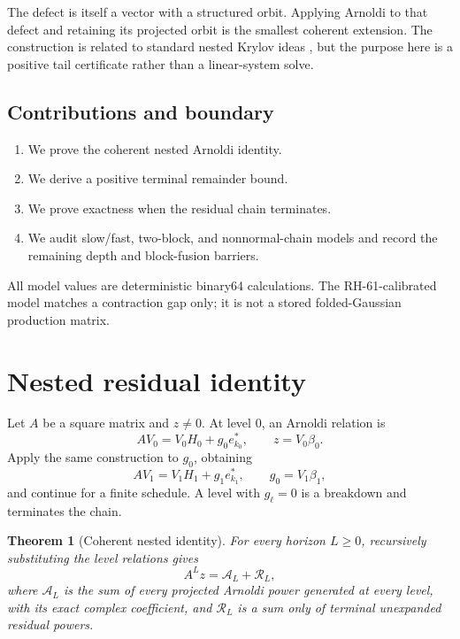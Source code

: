 \documentclass[11pt]{article}
\newtheorem{theorem}{Theorem}[section]
\begin{document}
The defect is itself a vector with a structured orbit.  Applying Arnoldi to
that defect and retaining its projected orbit is the smallest coherent
extension.  The construction is related to standard nested Krylov ideas
\citep{Saad2003,GolubVanLoan2013}, but the purpose here is a positive tail
certificate rather than a linear-system solve.

\subsection*{Contributions and boundary}

\begin{enumerate}[leftmargin=2.2em]
 \item We prove the coherent nested Arnoldi identity.
 \item We derive a positive terminal remainder bound.
 \item We prove exactness when the residual chain terminates.
 \item We audit slow/fast, two-block, and nonnormal-chain models and record
       the remaining depth and block-fusion barriers.
\end{enumerate}

All model values are deterministic binary64 calculations.  The
RH-61-calibrated model matches a contraction gap only; it is not a stored
folded-Gaussian production matrix.

\section{Nested residual identity}
\label{sec:identity}

Let $A$ be a square matrix and $z\ne0$.  At level $0$, an Arnoldi relation is
\begin{equation}
 AV_0=V_0H_0+g_0e_{k_0}^*,
 \qquad z=V_0\beta_0.
\label{eq:level-zero}
\end{equation}
Apply the same construction to $g_0$, obtaining
\begin{equation}
 AV_1=V_1H_1+g_1e_{k_1}^*,
 \qquad g_0=V_1\beta_1,
\label{eq:level-one}
\end{equation}
and continue for a finite schedule.  A level with $g_\ell=0$ is a
breakdown and terminates the chain.

\begin{theorem}[Coherent nested identity]
\label{thm:nested}
For every horizon $L\ge0$, recursively substituting the level relations
gives
\begin{equation}
 A^Lz
 = \mathcal A_L+
 \mathcal R_L,
\label{eq:nested-split}
\end{equation}
where $\mathcal A_L$ is the sum of every projected Arnoldi power generated
at every level, with its exact complex coefficient, and $\mathcal R_L$ is a
sum only of terminal unexpanded residual powers.
\end{theorem}
\end{document}
